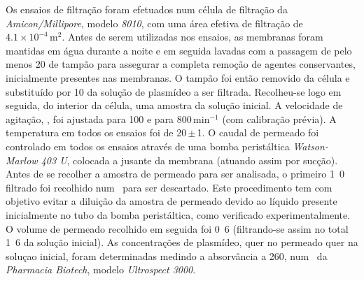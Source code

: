 Os ensaios de filtração foram efetuados num célula de filtração da \emph{Amicon/Millipore}, modelo \emph{8010}, com uma área efetiva de filtração de $4.1\times10^{-4}\,\mathrm{m}^{2}$.
%
Antes de serem utilizadas nos ensaios, as membranas foram mantidas em água durante a noite e em seguida lavadas com a passagem de pelo menos \unit{20}{\milli\liter} de tampão para assegurar a completa remoção de agentes conservantes, inicialmente presentes nas membranas. O tampão foi então removido da célula e substituído por \unit{10}{\milli\liter} da solução de plasmídeo a ser filtrada. Recolheu-se logo em seguida, do interior da célula, uma amostra da solução inicial.
%
A velocidade de agitação, \agitacao, foi ajustada para 100 e para 800\,min$^{-1}$ (com calibração prévia). A temperatura em todos os ensaios foi de 20\,$\pm$\,1\degreecelsius. O caudal de permeado foi controlado em todos os ensaios através de uma bomba peristáltica \emph{Watson-Marlow 403 U}, colocada a jusante da membrana (atuando assim por sucção).
%
Antes de se recolher a amostra de permeado para ser analisada, o primeiro \unit{1.0}{\milli\liter} filtrado foi recolhido num \eppendorf\ para ser descartado. Este procedimento tem com objetivo evitar a diluição da amostra de permeado devido ao líquido presente inicialmente no tubo da bomba peristáltica, como verificado experimentalmente. O volume de permeado recolhido em seguida foi \unit{0.6}{\milli\liter} (filtrando-se assim no total \unit{1.6}{\milli\liter} da solução inicial). As concentrações de plasmídeo, quer no permeado quer na soluçao inicial, foram determinadas medindo a absorvância a \unit{260}{\nano\meter}, num \espectrofotometro\ da \emph{Pharmacia Biotech}, modelo \emph{Ultrospect 3000}.
%
%

